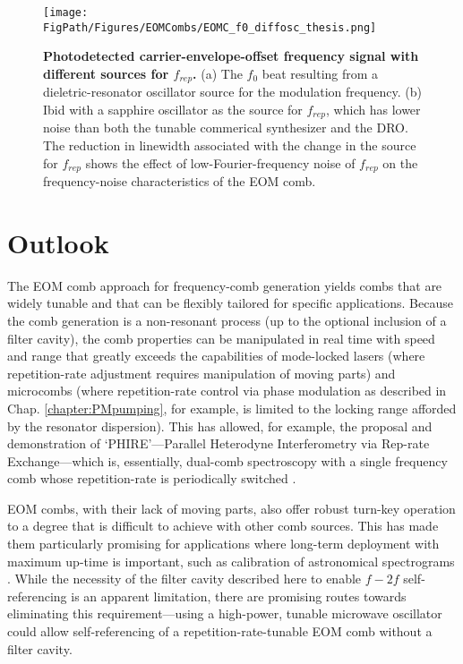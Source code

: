 \begin{figure}[htpb]
	\begin{center}
		\texttt{[image: \\FigPath/Figures/EOMCombs/EOMC\_f0\_diffosc\_thesis.png]}
	\end{center}
	\caption[Figure Title]{\textbf{Photodetected carrier-envelope-offset frequency signal with different sources for $f_{rep}$.} (a) The $f_0$ beat resulting from a dieletric-resonator oscillator source for the modulation frequency. (b) Ibid with a sapphire oscillator as the source for $f_{rep}$, which has lower noise than both the tunable commerical synthesizer and the DRO. The reduction in linewidth associated with the change in the source for $f_{rep}$ shows the effect of low-Fourier-frequency noise of $f_{rep}$ on the frequency-noise characteristics of the EOM comb. }
	\label{fig:EOMC_f0_sources}
\end{figure} 

\section{Outlook}
The EOM comb approach for frequency-comb generation yields combs that are widely tunable and that can be flexibly tailored for specific applications. Because the comb generation is a non-resonant process (up to the optional inclusion of a filter cavity), the comb properties can be manipulated in real time with speed and range that greatly exceeds the capabilities of mode-locked lasers (where repetition-rate adjustment requires manipulation of moving parts) and microcombs (where repetition-rate control via phase modulation as described in Chap. \ref{chapter:PMpumping}, for example, is limited to the locking range afforded by the resonator dispersion). This has allowed, for example, the proposal and demonstration of `PHIRE'---Parallel Heterodyne Interferometry via Rep-rate Exchange---which is, essentially, dual-comb spectroscopy \cite{Coddington2016}  with a single frequency comb whose repetition-rate is periodically switched \cite{Carlson2018}. 

EOM combs, with their lack of moving parts, also offer robust turn-key operation to a degree that is difficult to achieve with other comb sources. This has made them particularly promising for applications where long-term deployment with maximum up-time is important, such as calibration of astronomical spectrograms \cite{Metcalf2018} . While the necessity of the filter cavity described here to enable $f-2f$ self-referencing is an apparent limitation, there are promising routes towards eliminating this requirement---using a high-power, tunable microwave oscillator could allow self-referencing of a repetition-rate-tunable EOM comb without a filter cavity.

